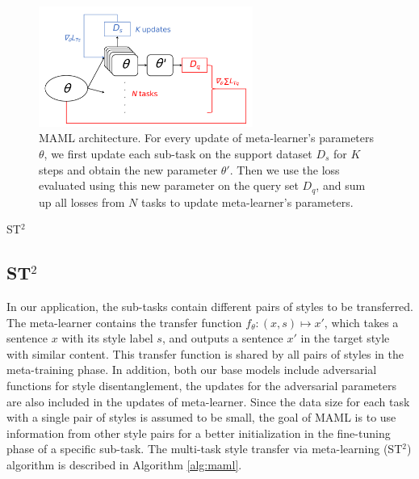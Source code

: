 \begin{figure}[th]
	\centering
	\includegraphics[width=7cm]{./images/maml.pdf}
	\caption{MAML architecture. For every update of meta-learner's parameters $\theta$, we first update each sub-task on the support dataset $D_s$ for $K$ steps and obtain the new parameter $\theta'$. Then we use the loss evaluated using this new parameter on the query set $D_q$, and sum up all losses from $N$ tasks to update meta-learner's parameters.}
	\label{fig:maml}
\end{figure}

\begin{algorithm}\small
	\caption{ST$^2$}
	\label{alg:maml}
\end{algorithm}

\subsection{ST$^2$}

In our application, the sub-tasks contain different pairs of styles to 
be transferred. The meta-learner contains the transfer function 
$f_{\theta}: (x, s)\mapsto x'$, which takes a sentence $x$ with its 
style label $s$, and outputs a sentence $x'$ in the target style with 
similar content. This transfer function is shared by all pairs of styles 
in the meta-training phase. In addition, both our base models include adversarial functions for style disentanglement, the updates for the adversarial parameters are also included in the updates of meta-learner. Since the data size for each task with a 
single pair of styles is assumed to be small, 
the goal of MAML is to use information from other style pairs for 
a better initialization in the fine-tuning phase of a specific sub-task. 
The multi-task style transfer via meta-learning (ST$^2$) algorithm is 
described in Algorithm \ref{alg:maml}. 
